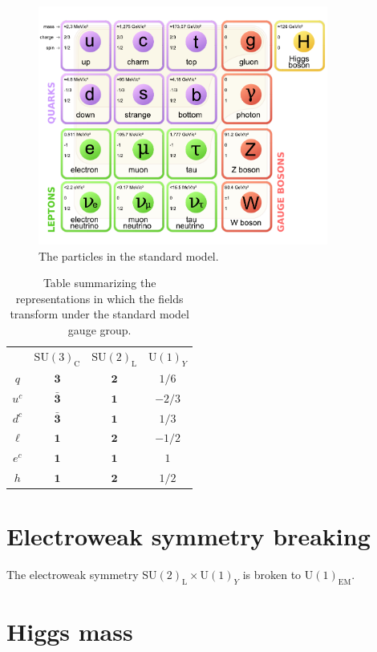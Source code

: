 \begin{figure}
\centering
\includegraphics[width=0.85\textwidth]{figs/theory/standardmodel.pdf}
\caption{\label{fig:standardmodel} The particles in the standard model.}
\end{figure}

\begin{table}
\centering
\begin{tabular}{c|ccc}
&$\mathrm{SU(3)}_{\mathrm{C}}$&$\mathrm{SU(2)}_{\mathrm{L}}$&$\mathrm{U(1)}_Y$ \\
$q$ & $\mathbf{3}$ & $\mathbf{2}$ & $1/6$\\
$u^c$ & $\mathbf{\bar 3}$ & $\mathbf{1}$ & $-2/3$\\
$d^c$ & $\mathbf{\bar 3}$ & $\mathbf{1}$ & $1/3$\\
$\ell$ & $\mathbf{1}$ & $\mathbf{2}$ & $-1/2$\\
$e^c$ & $\mathbf{1}$ & $\mathbf{1}$ & $1$\\\hline
$h$ & $\mathbf{1}$ & $\mathbf{2}$ & $1/2$
\end{tabular}
\caption{\label{tab:representations} Table summarizing the
    representations in which the fields transform under the standard
    model gauge group.}
\end{table}


\section{Electroweak symmetry breaking}
The electroweak symmetry $\mathrm{SU(2)}_{\mathrm{L}}\times
\mathrm{U(1)}_Y$ is broken to $\mathrm{U(1)}_{\mathrm{EM}}$.

\section{Higgs mass}


